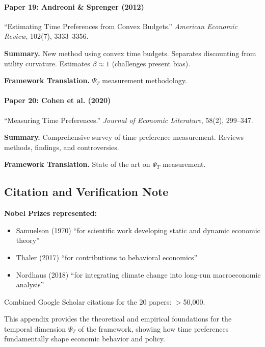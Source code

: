 \paragraph{Paper 19: Andreoni \& Sprenger (2012)}

``Estimating Time Preferences from Convex Budgets.''
\textit{American Economic Review}, 102(7), 3333--3356.

\textbf{Summary.}
New method using convex time budgets. Separates discounting from 
utility curvature. Estimates $\beta \approx 1$ (challenges present bias).

\textbf{Framework Translation.}
$\Psi_T$ measurement methodology.

\paragraph{Paper 20: Cohen et al. (2020)}

``Measuring Time Preferences.''
\textit{Journal of Economic Literature}, 58(2), 299--347.

\textbf{Summary.}
Comprehensive survey of time preference measurement.
Reviews methods, findings, and controversies.

\textbf{Framework Translation.}
State of the art on $\Psi_T$ measurement.

\subsection{Citation and Verification Note}

\textbf{Nobel Prizes represented:}
\begin{itemize}
    \item Samuelson (1970) ``for scientific work developing static and dynamic economic theory''
    \item Thaler (2017) ``for contributions to behavioral economics''
    \item Nordhaus (2018) ``for integrating climate change into long-run macroeconomic analysis''
\end{itemize}

Combined Google Scholar citations for the 20 papers: $>$50,000.

This appendix provides the theoretical and empirical foundations for the
temporal dimension $\Psi_T$ of the framework, showing how time preferences
fundamentally shape economic behavior and policy.


